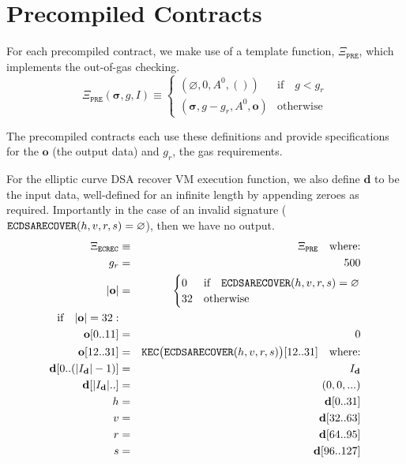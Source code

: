 \documentclass[9pt,oneside]{amsart}
\begin{document}
\section{Precompiled Contracts}\label{app:precompiled}

For each precompiled contract, we make use of a template function, $\Xi_{\mathtt{PRE}}$, which implements the out-of-gas checking.
\begin{equation}
\Xi_{\mathtt{PRE}}(\boldsymbol{\sigma}, g, I) \equiv \begin{cases}
(\varnothing, 0, A^0, ()) & \text{if} \quad g < g_r \\
(\boldsymbol\sigma, g - g_r, A^0, \mathbf{o}) & \text{otherwise}\end{cases}
\end{equation}

The precompiled contracts each use these definitions and provide specifications for the $\mathbf{o}$ (the output data) and $g_r$, the gas requirements.

For the elliptic curve DSA recover VM execution function, we also define $\mathbf{d}$ to be the input data, well-defined for an infinite length by appending zeroes as required. Importantly in the case of an invalid signature ($\mathtt{\tiny ECDSARECOVER}(h, v, r, s) = \varnothing$), then we have no output.
\begin{eqnarray}
\Xi_{\mathtt{ECREC}} &\equiv& \Xi_{\mathtt{PRE}} \quad \text{where:} \\
g_r &=& 500\\
|\mathbf{o}| &=& \begin{cases} 0 & \text{if} \quad \mathtt{\tiny ECDSARECOVER}(h, v, r, s) = \varnothing\\ 32 & \text{otherwise} \end{cases}\\
\text{if} \quad |\mathbf{o}| = 32: &&\\
\mathbf{o}[0..11] &=& 0 \\
\mathbf{o}[12..31] &=& \mathtt{\tiny KEC}\big(\mathtt{\tiny ECDSARECOVER}(h, v, r, s)\big)[12..31] \quad \text{where:}\\
\mathbf{d}[0..(|I_\mathbf{d}|-1)] &=& I_\mathbf{d}\\
\mathbf{d}[|I_\mathbf{d}|..] &=& (0, 0, ...) \\
h &=& \mathbf{d}[0..31]\\
v &=& \mathbf{d}[32..63]\\
r &=& \mathbf{d}[64..95]\\
s &=& \mathbf{d}[96..127]
\end{eqnarray}
\end{document}
